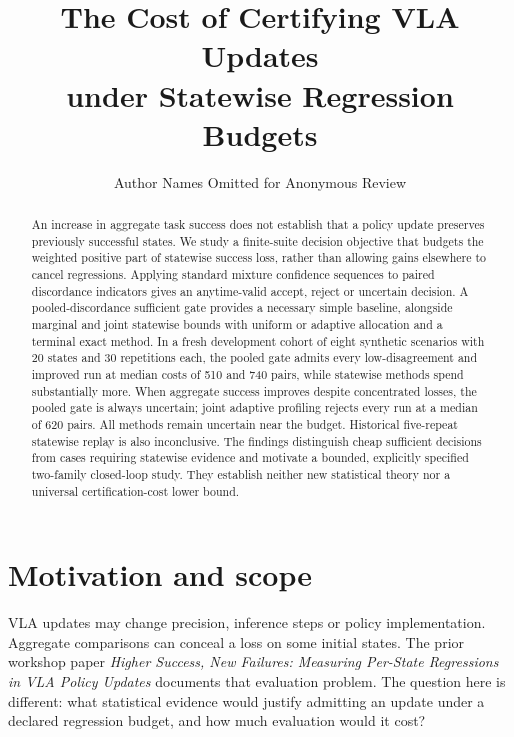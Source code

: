 \documentclass[conference]{IEEEtran}
\begin{document}
\title{The Cost of Certifying VLA Updates\\under Statewise Regression Budgets}
\author{Author Names Omitted for Anonymous Review}
\maketitle
\begin{abstract}

An increase in aggregate task success does not establish that a policy update preserves previously successful states. We study a finite-suite decision objective that budgets the weighted positive part of statewise success loss, rather than allowing gains elsewhere to cancel regressions. Applying standard mixture confidence sequences to paired discordance indicators gives an anytime-valid accept, reject or uncertain decision. A pooled-discordance sufficient gate provides a necessary simple baseline, alongside marginal and joint statewise bounds with uniform or adaptive allocation and a terminal exact method. In a fresh development cohort of eight synthetic scenarios with 20 states and 30 repetitions each, the pooled gate admits every low-disagreement and improved run at median costs of 510 and 740 pairs, while statewise methods spend substantially more. When aggregate success improves despite concentrated losses, the pooled gate is always uncertain; joint adaptive profiling rejects every run at a median of 620 pairs. All methods remain uncertain near the budget. Historical five-repeat statewise replay is also inconclusive. The findings distinguish cheap sufficient decisions from cases requiring statewise evidence and motivate a bounded, explicitly specified two-family closed-loop study. They establish neither new statistical theory nor a universal certification-cost lower bound.

\end{abstract}\IEEEpeerreviewmaketitle
\section{Motivation and scope}

VLA updates may change precision, inference steps or policy implementation. Aggregate comparisons can conceal a loss on some initial states. The prior workshop paper \emph{Higher Success, New Failures: Measuring Per-State Regressions in VLA Policy Updates} \cite{prior} documents that evaluation problem. The question here is different: what statistical evidence would justify admitting an update under a declared regression budget, and how much evaluation would it cost?
\end{document}
